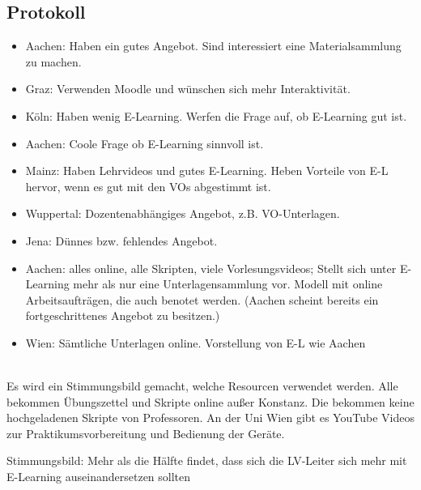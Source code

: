 \subsection*{Protokoll}
	\begin{itemize}
		\item Aachen: Haben ein gutes Angebot. Sind interessiert eine Materialsammlung zu machen.

		\item Graz: Verwenden Moodle und wünschen sich mehr Interaktivität.

		\item Köln: Haben wenig E-Learning. Werfen die Frage auf, ob E-Learning gut ist.

		\item Aachen: Coole Frage ob E-Learning sinnvoll ist.

		\item Mainz: Haben Lehrvideos und gutes E-Learning. Heben Vorteile von E-L hervor, wenn es gut mit den VOs abgestimmt ist.

		\item Wuppertal: Dozentenabhängiges Angebot, z.B. VO-Unterlagen.

		\item Jena: Dünnes bzw. fehlendes Angebot.

		\item Aachen: alles online, alle Skripten, viele Vorlesungsvideos;
		Stellt sich unter E-Learning mehr als nur eine Unterlagensammlung vor. Modell mit online Arbeitsaufträgen, die auch benotet werden. (Aachen scheint bereits ein fortgeschrittenes Angebot zu besitzen.)

		\item Wien: Sämtliche Unterlagen online. Vorstellung von E-L wie Aachen
	\end{itemize} \\

	Es wird ein Stimmungsbild gemacht, welche Resourcen verwendet werden. Alle bekommen Übungszettel und Skripte online außer Konstanz. Die bekommen keine hochgeladenen Skripte von Professoren. An der Uni Wien gibt es YouTube Videos zur Praktikumsvorbereitung und Bedienung der Ger\"ate.

	Stimmungsbild: Mehr als die Hälfte findet, dass sich die LV-Leiter sich mehr mit E-Learning auseinandersetzen sollten

